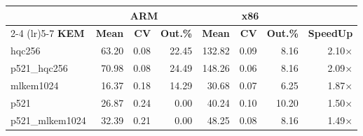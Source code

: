 \begin{table}[!ht]
\begin{tabular}{lrrr|rrr|r}
 \toprule
& \multicolumn{3}{c}{\bfseries ARM} & \multicolumn{3}{c}{\bfseries x86} &\\
\cmidrule(lr){2-4} \cmidrule(lr){5-7}
\textbf{KEM} & \textbf{Mean} & \textbf{CV} & \textbf{Out.\%} & \textbf{Mean} & \textbf{CV} & \textbf{Out.\%} & \textbf{SpeedUp}\\
\midrule
hqc256 & 63.20 & 0.08 & 22.45 & 132.82 & 0.09 & 8.16 & 2.10× \\
p521_hqc256 & 70.98 & 0.08 & 24.49 & 148.26 & 0.06 & 8.16 & 2.09× \\
mlkem1024 & 16.37 & 0.18 & 14.29 & 30.68 & 0.07 & 6.25 & 1.87× \\
p521 & 26.87 & 0.24 & 0.00 & 40.24 & 0.10 & 10.20 & 1.50× \\
p521_mlkem1024 & 32.39 & 0.21 & 0.00 & 48.25 & 0.08 & 8.16 & 1.49× \\
\bottomrule
\end{tabular}
\end{table}
